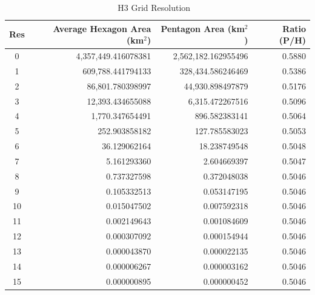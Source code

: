 \begin{table}[h]
\centering
\begin{tabular}{|c|r|r|r|}
\hline
\textbf{Res} & \textbf{Average Hexagon Area (km$^2$)} & \textbf{Pentagon Area (km$^2$)} & \textbf{Ratio (P/H)} \\
\hline
0 & 4,357,449.416078381 & 2,562,182.162955496 & 0.5880 \\
1 & 609,788.441794133 & 328,434.586246469 & 0.5386 \\
2 & 86,801.780398997 & 44,930.898497879 & 0.5176 \\
3 & 12,393.434655088 & 6,315.472267516 & 0.5096 \\
4 & 1,770.347654491 & 896.582383141 & 0.5064 \\
5 & 252.903858182 & 127.785583023 & 0.5053 \\
6 & 36.129062164 & 18.238749548 & 0.5048 \\
7 & 5.161293360 & 2.604669397 & 0.5047 \\
8 & 0.737327598 & 0.372048038 & 0.5046 \\
9 & 0.105332513 & 0.053147195 & 0.5046 \\
10 & 0.015047502 & 0.007592318 & 0.5046 \\
11 & 0.002149643 & 0.001084609 & 0.5046 \\
12 & 0.000307092 & 0.000154944 & 0.5046 \\
13 & 0.000043870 & 0.000022135 & 0.5046 \\
14 & 0.000006267 & 0.000003162 & 0.5046 \\
15 & 0.000000895 & 0.000000452 & 0.5046 \\
\hline
\end{tabular}
\caption{H3 Grid Resolution ~\cite{H3Geo.}}
\label{tab:resolutions}
\end{table}

